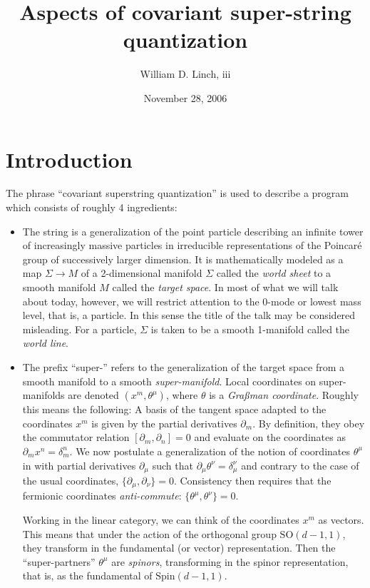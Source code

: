 \documentclass[12pt]{article}
\title{Aspects of covariant super-string quantization}
\author{William D. Linch, {\sc iii}}
\date{November 28, 2006}                                           %
\def\SO#1{\mathrm{SO}(#1)}
\begin{document}
\maketitle


\section{Introduction}

The phrase ``covariant superstring quantization'' is used to describe a program which consists of roughly 4 ingredients:
\begin{itemize}
\item The string is a generalization of the point particle describing an infinite tower of increasingly massive particles in irreducible representations of the Poincar\'e group of successively larger dimension.  It is mathematically modeled as a map $\Sigma \to M$ of a 2-dimensional manifold $\Sigma$ called the {\em world sheet} to a smooth manifold $M$ called the {\em target space}. In most of what we will talk about today, however, we will restrict attention to the 0-mode or lowest mass level, that is, a particle. In this sense the title of the talk may be considered misleading. For a particle, $\Sigma$ is taken to be a smooth 1-manifold called the {\em world line}. 
\item The prefix ``super-'' refers to the generalization of the target space from a smooth manifold to a smooth {\em super-manifold}. Local coordinates on super-manifolds are denoted $(x^m, \theta^\mu)$, where $\theta$ is a {\em Gra\ss man coordinate}. Roughly this means the following: A basis of the tangent space adapted to the coordinates $x^m$ is given by the partial derivatives $\partial_m$. By definition, they obey the commutator relation $[\partial_m, \partial _n]=0$ and evaluate on the coordinates as $\partial_m x^n=\delta_m^n$. We now postulate a generalization of the notion of coordinates $\theta^\mu$ in with partial derivatives $\partial_\mu$ such that $\partial_\mu \theta^\nu=\delta_\mu^\nu$ and contrary to the case of the usual coordinates, $\{\partial_\mu, \partial_\nu\}=0$. Consistency then requires that the fermionic coordinates {\em anti-commute}: $\{\theta^\mu, \theta^\nu\}=0$. 

Working in the linear category, we can think of the coordinates $x^m$ as vectors. This means that under the action of the orthogonal group $\SO{d-1,1}$, they transform in the fundamental (or vector) representation. Then the ``super-partners'' $\theta^\mu$ are {\em spinors}, transforming in the spinor representation, that is, as the fundamental of $\mathrm{Spin}(d-1,1)$. 


\end{itemize}
\end{document}

